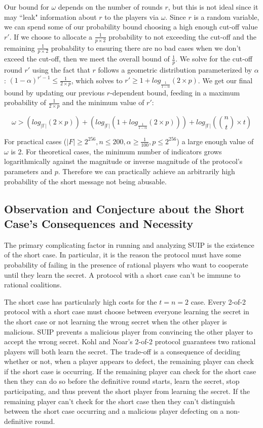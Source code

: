 \documentclass{dalcsthesis}
\begin{document}
Our bound for $\omega$ depends on the number of rounds $r$, but this is not ideal since it may ``leak" information about $r$ to the players via $\omega$. Since $r$ is a random variable, we can spend some of our probability bound choosing a high enough cut-off value $r'$. If we choose to allocate a $\frac{1}{p \times 2}$ probability to not exceeding the cut-off and the remaining $\frac{1}{p \times 2}$ probability to ensuring there are no bad cases when we don't exceed the cut-off, then we meet the overall bound of $\frac{1}{p}$. We solve for the cut-off round $r'$ using the fact that $r$ follows a geometric distribution parameterized by $\alpha$: $(1 - \alpha)^{r'-1} \leq \frac{1}{2 \times p}$, which solves to $r' \geq 1 + log_{\frac{1}{1-\alpha}}(2 \times p)$. We get our final bound by updating our previous $r$-dependent bound, feeding in a maximum probability of $\frac{1}{2 \times p}$ and the minimum value of $r'$:

$$\omega > (log_{|\mathbb{F}|} (2 \times p)) + (log_{|\mathbb{F}|} (1 + log_{\frac{1}{1-\alpha}}(2 \times p))) + log_{|\mathbb{F}|} (\binom{n}{t} \times t)$$

For practical cases ($|F| \geq 2^{256}, n \leq 200, \alpha \geq \frac{1}{100}, p \leq 2^{256}$) a large enough value of $\omega$ is 2. For theoretical cases, the minimum number of indicators grows logarithmically against the magnitude or inverse magnitude of the protocol's parameters and $p$. Therefore we can practically achieve an arbitrarily high probability of the short message not being abusable.

\subsection{Observation and Conjecture about the Short Case's Consequences and Necessity}

The primary complicating factor in running and analyzing SUIP is the existence of the short case. In particular, it is the reason the protocol must have some probability of failing in the presence of rational players who want to cooperate until they learn the secret. A protocol with a short case can't be immune to rational coalitions.

The short case has particularly high costs for the $t=n=2$ case. Every 2-of-2 protocol with a short case must choose between everyone learning the secret in the short case or not learning the wrong secret when the other player is malicious. SUIP prevents a malicious player from convincing the other player to accept the wrong secret. Kohl and Noar's 2-of-2 protocol \cite{kol08} guarantees two rational players will both learn the secret. The trade-off is a consequence of deciding whether or not, when a player appears to defect, the remaining player can check if the short case is occurring. If the remaining player can check for the short case then they can do so before the definitive round starts, learn the secret, stop participating, and thus prevent the short player from learning the secret. If the remaining player can't check for the short case then they can't distinguish between the short case occurring and a malicious player defecting on a non-definitive round.
\end{document}
